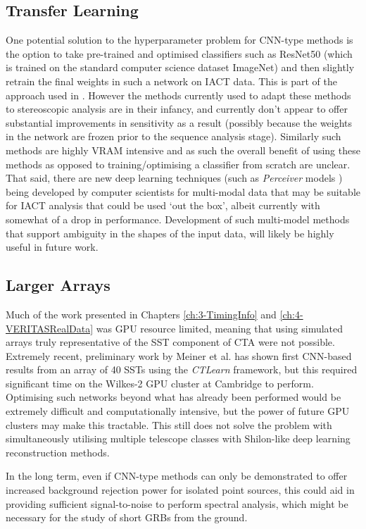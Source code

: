 \subsection{Transfer Learning}
One potential solution to the hyperparameter problem for CNN-type methods is the option to take pre-trained and optimised classifiers such as ResNet50 \cite{resnet50} (which is trained on the standard computer science dataset ImageNet) and then slightly retrain the final weights in such a network on IACT data. This is part of the approach used in \cite{tjarkicrc}. However the methods currently used to adapt these methods to stereoscopic analysis are in their infancy, and currently don't appear to offer substantial improvements in sensitivity as a result (possibly because the weights in the network are frozen prior to the sequence analysis stage). Similarly such methods are highly VRAM intensive and as such the overall benefit of using these methods as opposed to training/optimising a classifier from scratch are unclear. That said, there are new deep learning techniques (such as \textit{Perceiver} models \cite{perceiver}) being developed by computer scientists for multi-modal data that may be suitable for IACT analysis that could be used `out the box', albeit currently with somewhat of a drop in performance. Development of such multi-model methods that support ambiguity in the shapes of the input data, will likely be highly useful in future work.

\subsection{Larger Arrays}
Much of the work presented in Chapters \ref{ch:3-TimingInfo} and \ref{ch:4-VERITASRealData} was GPU resource limited, meaning that using simulated arrays truly representative of the SST component of CTA were not possible. Extremely recent, preliminary work by Meiner et al. \cite{tjarkicrc} has shown first CNN-based results from an array of 40 SSTs using the \textit{CTLearn} framework, but this required significant time on the Wilkes-2 GPU cluster at Cambridge to perform. Optimising such networks beyond what has already been performed would be extremely difficult and computationally intensive, but the power of future GPU clusters may make this tractable. This still does not solve the problem with simultaneously utilising multiple telescope classes with Shilon-like deep learning reconstruction methods.

In the long term, even if CNN-type methods can only be demonstrated to offer increased background rejection power for isolated point sources, this could aid in providing sufficient signal-to-noise to perform spectral analysis, which might be necessary for the study of short GRBs from the ground.
